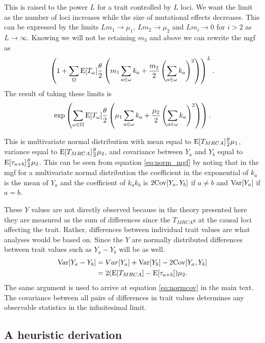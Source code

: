 This is raised to the power $L$ for a trait controlled by $L$ loci. We want the
limit as the number of loci increases while the size of mutational effects
decreases. This can be expressed by the limits $L m_1 \to \mu_1$, $L m_2\to
\mu_2$ and $L m_i\to 0$ for $i>2$ as $L \to \infty$. Knowing we will not be
retaining $m_3$ and above we can rewrite the mgf as
\begin{equation*}
  \left(1 + \sum_{\Omega} \mathrm{E}[T_\omega] \frac{\theta}{2} \left(m_1 \sum_{a \in \omega} k_a +
  \frac{m_2}{2} \left(\sum_{a \in \omega} k_a \right)^2\right)\right)^L.
\end{equation*}
The result of taking these limits is
\begin{equation}
  \label{eq:norm_mgf}
  \exp \left( \sum_{\omega \in \Omega}\mathrm{E}[T_{\omega}] \frac{\theta}{2} \left( \mu_1 
  \sum_{a \in \omega} k_a + \frac{\mu_2}{2}\left( \sum_{a \in \omega}
  k_a\right)^2\right)\right).
\end{equation}

This is multivariate normal distribution with mean equal to $\mathrm{E}[T_{MRCA}] \frac{\theta}{2} \mu_1$,
variance equal to $\mathrm{E}[T_{MRCA}] \frac{\theta}{2} \mu_2$, and covariance between $Y_a$ and $Y_b$
equal to $\mathrm{E}[\tau_{a+b}] \frac{\theta}{2} \mu_2$. This can be seen from equation
\eqref{eq:norm_mgf} by noting that in the mgf for a multivariate normal
distribution the coefficient in the exponential of $k_a$ is the mean of $Y_a$
and the coefficient of $k_ak_b$ is $2\mathrm{Cov}[Y_a,Y_b]$ if $a\neq b$ and $\mathrm{Var}[Y_a]$
if $a=b$.

These $Y$ values are not directly observed because in the theory presented here
they are measured as the sum of differences since the $T_{MRCA}$s at the causal
loci affecting the trait. Rather, differences between individual trait values
are what analyses would be based on. Since the $Y$ are normally distributed
differences between trait values such as $Y_a-Y_b$ will be as well.
\begin{align*}
  \mathrm{Var}[Y_a-Y_b] &= Var[Y_a] + \mathrm{Var}[Y_b] - 2\mathrm{Cov}[Y_a,Y_b]\\
                &= 2(\mathrm{E}[T_{MRCA}] - \mathrm{E}[\tau_{a+b}])\mu_2.
\end{align*}
The same argument is used to arrive at equation \eqref{eq:normcov} in the main
text. The covariance between all pairs of differences in trait values determines
any observable statistics in the infinitesimal limit. 

\subsection{A heuristic derivation}

